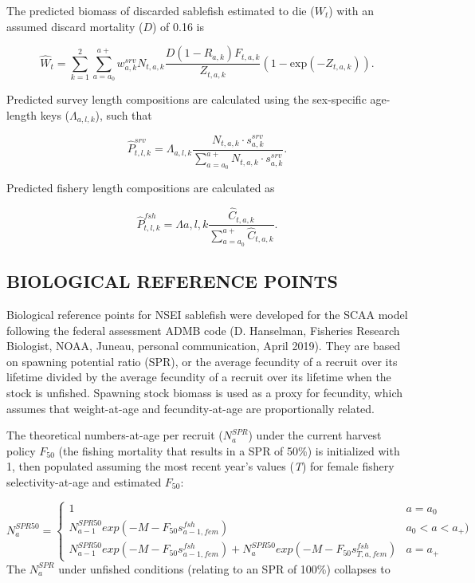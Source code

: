 \documentclass[
]{article}
\begin{document}
The predicted biomass of discarded sablefish estimated to die (\(W_t\)) with an assumed discard mortality (\(D\)) of 0.16 is

\[
\begin{equation}
\hat{W}_t= \sum_{k=1}^{2}\sum_{a=a_0}^{a+}w_{a,k}^{srv}N_{t,a,k}\frac{D (1-R_{a,k})F_{t,a,k}}{Z_{t,a,k}}(1-\mbox{exp}(-Z_{t,a,k})).
\label{eq:wastage}
\end{equation}
\]

Predicted survey length compositions are calculated using the sex-specific age-length keys (\(\Lambda_{a,l,k}\)), such that

\[
\begin{equation}
\hat{P}_{t,l,k}^{srv}=\Lambda_{a,l,k}\frac{N_{t,a,k} \cdot s_{a,k}^{srv}}{\sum_{a=a_0}^{a+} N_{t,a,k} \cdot s_{a,k}^{srv}}.
\label{eq:predsrvlen}
\end{equation}
\]

Predicted fishery length compositions are calculated as

\[
\begin{equation}
\hat{P}_{t,l,k}^{fsh}=\Lambda{a,l,k}\frac{\hat{C}_{t,a,k}}{\sum_{a=a_0}^{a+} \hat{C}_{t,a,k}}.
\label{eq:predfshlen}
\end{equation}
\]

\hypertarget{biological-reference-points}{%
\subsection{BIOLOGICAL REFERENCE POINTS}\label{biological-reference-points}}

Biological reference points for NSEI sablefish were developed for the SCAA model following the federal assessment ADMB code (D. Hanselman, Fisheries Research Biologist, NOAA, Juneau, personal communication, April 2019). They are based on spawning potential ratio (SPR), or the average fecundity of a recruit over its lifetime divided by the average fecundity of a recruit over its lifetime when the stock is unfished. Spawning stock biomass is used as a proxy for fecundity, which assumes that weight-at-age and fecundity-at-age are proportionally related.

The theoretical numbers-at-age per recruit (\(N_a^{SPR}\)) under the current harvest policy \(F_{50}\) (the fishing mortality that results in a SPR of 50\%) is initialized with 1, then populated assuming the most recent year's values (\emph{T}) for female fishery selectivity-at-age and estimated \(F_{50}\):

\[
\begin{equation}
N_{a}^{SPR50} = \left\{ \begin{array}{lll}
1 &a = a_{0}\\
N_{a-1}^{SPR50}exp(-M-F_{50}s^{fsh}_{a-1,fem}) &a_{0} < a < a_{+})\\
N_{a-1}^{SPR50}exp(-M-F_{50}s^{fsh}_{a-1,fem}) +  N_{a}^{SPR50}exp(-M-F_{50}s^{fsh}_{T,a,fem}) &a=a_{+}
\end{array}\right.
\label{eq:Nspr50}
\end{equation}
\]
The \(N_a^{SPR}\) under unfished conditions (relating to an SPR of 100\%) collapses to
\end{document}
